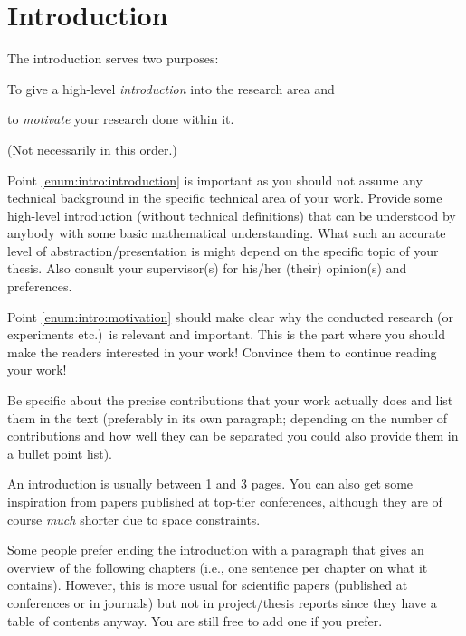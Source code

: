 \chapter{Introduction}

The introduction serves two purposes:
\begin{compactenum}
  \item To give a high-level \emph{introduction} into the research area and\label{enum:intro:introduction}
  \item to \emph{motivate} your research done within it.\label{enum:intro:motivation}
\end{compactenum}
(Not necessarily in this order.)

Point \ref{enum:intro:introduction} is important as you should not assume any technical background in the specific technical area of your work. Provide some high-level introduction (without technical definitions) that can be understood by anybody with some basic mathematical understanding. What such an accurate level of abstraction/presentation is might depend on the specific topic of your thesis. Also consult your supervisor(s) for his/her (their) opinion(s) and preferences. 

Point \ref{enum:intro:motivation} should make clear why the conducted research (or experiments etc.)\ is relevant and important. This is the part where you should make the readers interested in your work! Convince them to continue reading your work!

Be specific about the precise contributions that your work actually does and list them in the text (preferably in its own paragraph; depending on the number of contributions and how well they can be separated you could also provide them in a bullet point list).

An introduction is usually between 1 and 3 pages. You can also get some inspiration from papers published at top-tier conferences, although they are of course \emph{much} shorter due to space constraints.

Some people prefer ending the introduction with a paragraph that gives an overview of the following chapters (i.e., one sentence per chapter on what it contains). However, this is more usual for scientific papers (published at conferences or in journals) but not in project/thesis reports since they have a table of contents anyway. You are still free to add one if you prefer.



